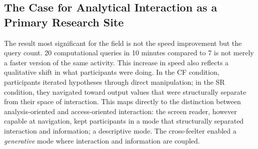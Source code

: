\documentclass[12pt]{cmuthesis}
\begin{document}



\subsection{The Case for Analytical Interaction as a Primary Research Site}
\label{sec:imperative-1}

The result most significant for the field is not the speed improvement but the query count. 20 computational queries in 10 minutes compared to 7 is not merely a faster version of the same activity. This increase in speed also reflects a qualitative shift in what participants were doing. In the CF condition, participants iterated hypotheses through direct manipulation; in the SR condition, they navigated toward output values that were structurally separate from their space of interaction. This maps directly to the distinction between analysis-oriented and access-oriented interaction: the screen reader, however capable at navigation, kept participants in a mode that structurally separated interaction and information; a descriptive mode. The cross-feelter enabled a \textit{generative} mode where interaction and information are coupled.
\end{document}

